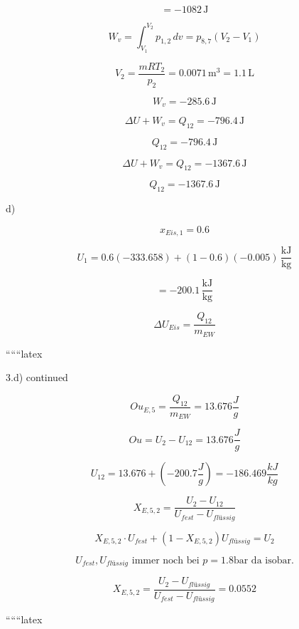 \[
= -1082 \, \text{J}
\]

\[
W_v = \int_{V_1}^{V_2} p_{1,2} \, dv = p_{8,7} (V_2 - V_1)
\]

\[
V_2 = \frac{mRT_2}{p_2} = 0.0071 \, \text{m}^3 = 1.1 \, \text{L}
\]

\[
W_v = -285.6 \, \text{J}
\]

\[
\Delta U + W_v = Q_{12} = -796.4 \, \text{J}
\]

\[
Q_{12} = -796.4 \, \text{J}
\]

\[
\Delta U + W_v = Q_{12} = -1367.6 \, \text{J}
\]

\[
Q_{12} = -1367.6 \, \text{J}
\]

d)

\[
x_{Eis,1} = 0.6
\]

\[
U_1 = 0.6 (-333.658) + (1 - 0.6) (-0.005) \, \frac{\text{kJ}}{\text{kg}}
\]

\[
= -200.1 \, \frac{\text{kJ}}{\text{kg}}
\]

\[
\Delta U_{Eis} = \frac{Q_{12}}{m_{EW}}
\]

``````latex


3.d) continued

\[
Ou_{E,5} = \frac{Q_{12}}{m_{EW}} = \boxed{13.676 \frac{J}{g}}
\]

\[
Ou = U_2 - U_{12} = 13.676 \frac{J}{g}
\]

\[
U_{12} = 13.676 + (-200.7 \frac{J}{g}) = \boxed{-186.469 \frac{kJ}{kg}}
\]

\[
X_{E,5,2} = \frac{U_2 - U_{12}}{U_{fest} - U_{flüssig}}
\]

\[
X_{E,5,2} \cdot U_{fest} + (1 - X_{E,5,2}) U_{flüssig} = U_2
\]

\[
U_{fest}, U_{flüssig} \text{ immer noch bei } p = 1.8 \text{bar} \text{ da isobar.}
\]

\[
X_{E,5,2} = \frac{U_2 - U_{flüssig}}{U_{fest} - U_{flüssig}} = \boxed{0.0552}
\]

``````latex


